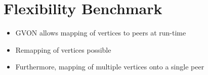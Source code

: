 \section{Flexibility Benchmark}
\begin{itemize}
\item GVON allows mapping of vertices to peers at run-time
\item Remapping of vertices possible
\item Furthermore, mapping of multiple vertices onto a single peer
\end{itemize}



\cleardoublepage

